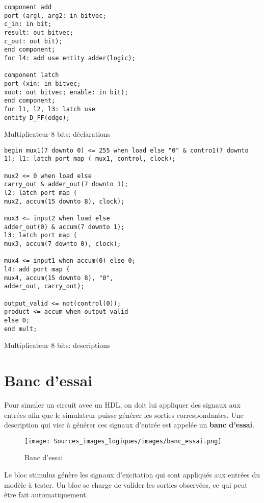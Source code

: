 \documentclass[letter, oneside]{book}
\begin{document}
\begin{enumerate}
\begin{listing}[htbp]
\begin{verbatim}
component add
port (argl, arg2: in bitvec;
c_in: in bit;
result: out bitvec;
c_out: out bit);
end component;
for l4: add use entity adder(logic);

component latch
port (xin: in bitvec;
xout: out bitvec; enable: in bit);
end component;
for l1, l2, l3: latch use
entity D_FF(edge);
\end{verbatim}
\caption{Multiplicateur 8 bits: déclarations}
\end{listing}


\begin{listing}[htbp]
\begin{verbatim}
begin mux1(7 downto 0) <= 255 when load else "0" & contro1(7 downto
1); l1: latch port map ( mux1, control, clock);

mux2 <= 0 when load else
carry_out & adder_out(7 downto 1);
l2: latch port map (
mux2, accum(15 downto 8), clock);

mux3 <= input2 when load else
adder_out(0) & accum(7 downto 1);
l3: latch port map (
mux3, accum(7 downto 0), clock);

mux4 <= input1 when accum(0) else 0;
l4: add port map (
mux4, accum(15 downto 8), "0",
adder_out, carry_out);

output_valid <= not(control(0));
product <= accum when output_valid
else 0;
end mult;
\end{verbatim}
\caption{Multiplicateur 8 bits: descriptions}
\end{listing}
\end{enumerate}


\section{Banc d'essai}
\label{sec:org37f2b8d}

Pour simuler un circuit avec un HDL, on doit lui appliquer des signaux
aux entrées afin que le simulateur puisse générer les sorties
correspondantes. Une description qui vise à générer ces signaux
d'entrée est appelée un \textbf{banc d'essai}.


\begin{figure}[htbp]
\centering
\texttt{[image: Sources\_images\_logiques/images/banc\_essai.png]}
\caption{\label{fig:org89fe840}Banc d'essai}
\end{figure}

Le bloc stimulus génère les signaux d'excitation qui sont appliqués
aux entrées du modèle à tester. Un bloc se charge de valider les
sorties observées, ce qui peut être fait automatiquement.
\end{document}
